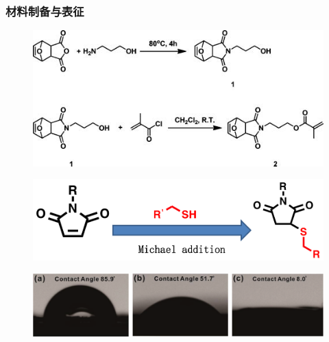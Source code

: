\documentclass{beamer}
\begin{document}
\begin{frame}
  \frametitle{材料制备与表征}
  \begin{minipage}{0.48\textwidth}
    \begin{figure}[h]
      \centering
      \includegraphics[width=0.95\linewidth]{figures/maleimide-struc.jpg}
    \end{figure}
    \begin{figure}[h]
      \centering
      \includegraphics[width=0.85\linewidth]{figures/maleimide-principle.png}
    \end{figure}
    \begin{figure}[b]
      \centering
      \includegraphics[width=0.95\linewidth]{figures/maleimide-CA.png}
    \end{figure}
  \end{minipage}
  \hfill
  \begin{minipage}{0.48\textwidth}
    \begin{figure}[h]
      \centering

\end{figure}
\end{minipage}
\end{frame}
\end{document}
